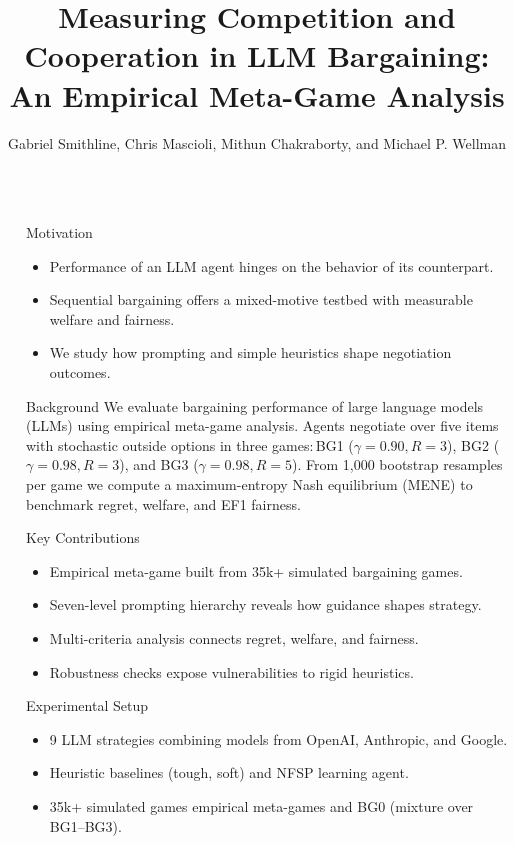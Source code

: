 \documentclass[final]{beamer}
\title{Measuring Competition and Cooperation in LLM Bargaining: An Empirical Meta-Game Analysis}
\author{Gabriel Smithline, Chris Mascioli, Mithun Chakraborty, and Michael P. Wellman}
\institute[shortinst]{School of Information, University of Michigan}
\newlength{\sepwidth}
\newlength{\colwidth}
\newcommand{\separatorcolumn}{\begin{column}{\sepwidth}\end{column}}
\begin{document}
\begin{frame}[t]
\begin{columns}[t]
\separatorcolumn

\begin{column}{\colwidth}

  \begin{block}{Motivation}
  \begin{itemize}
    \item Performance of an LLM agent hinges on the behavior of its counterpart.
    \item Sequential bargaining offers a mixed-motive testbed with measurable
          welfare and fairness.
    \item We study how prompting and simple heuristics shape negotiation
          outcomes.
  \end{itemize}
  \end{block}

  \begin{block}{Background}
  We evaluate bargaining performance of large language models (LLMs) using
  empirical meta-game analysis. Agents negotiate over five items with stochastic
  outside options in three games:\@\,BG1 ($\gamma=0.90,R=3$), BG2
  ($\gamma=0.98,R=3$), and BG3 ($\gamma=0.98,R=5$). From 1,000 bootstrap
  resamples per game we compute a maximum-entropy Nash equilibrium (MENE) to
  benchmark regret, welfare, and EF1 fairness.
  \end{block}

  \begin{block}{Key Contributions}
  \begin{itemize}
    \item Empirical meta-game built from 35k+ simulated bargaining games.
    \item Seven-level prompting hierarchy reveals how guidance shapes strategy.
    \item Multi-criteria analysis connects regret, welfare, and fairness.
    \item Robustness checks expose vulnerabilities to rigid heuristics.
  \end{itemize}
  \end{block}

  \begin{block}{Experimental Setup}
  \begin{itemize}
    \item 9 LLM strategies combining models from OpenAI, Anthropic, and Google.
    \item Heuristic baselines {\small (tough, soft)} and NFSP learning agent.
    \item 35k+ simulated games \textrightarrow{} empirical meta-games and BG0
          (mixture over BG1--BG3).
  \end{itemize}
  \end{block}


\end{column}
\end{columns}
\end{frame}
\end{document}
